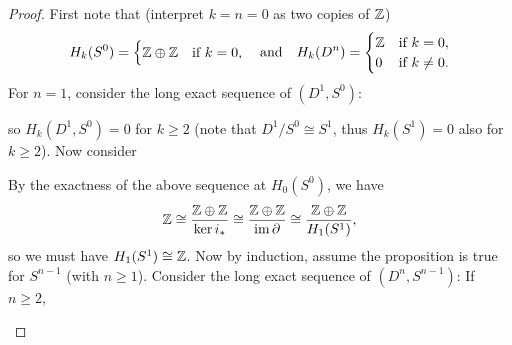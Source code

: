 \begin{proof}
  First note that (interpret $k = n = 0$ as
  two copies of $\mathbb{Z}$)
  \[
    H_k(S^0) =
    \begin{cases}
      \mathbb{Z} \oplus \mathbb{Z} & \text{if } k = 0, \\
    \end{cases}
    \quad \text{and} \quad
    H_k(D^n) =
    \begin{cases}
      \mathbb{Z} & \text{if } k = 0, \\
      0 & \text{if $k \ne 0$}.
    \end{cases}
  \]
  For $n = 1$, consider the long exact sequence of
  $(D^1, S^0)$:
  \begin{center}
  \end{center}
  so $H_k(D^1, S^0) = 0$ for $k \ge 2$ (note that
  $D^1 / S^0 \cong S^1$, thus $H_k(S^1) = 0$ also
  for $k \ge 2$). Now consider
  \begin{center}
  \end{center}
  By the exactness of the above sequence at $H_0(S^0)$,
  we have
  \[
    \mathbb{Z} \cong \frac{\mathbb{Z} \oplus \mathbb{Z}}{\ker i_*}
    \cong \frac{\mathbb{Z} \oplus \mathbb{Z}}{\operatorname{im} \partial}
    \cong \frac{\mathbb{Z} \oplus \mathbb{Z}}{H_1(S^1)},
  \]
  so we must have $H_1(S^1) \cong \mathbb{Z}$.
  Now by induction, assume the proposition is
  true for $S^{n - 1}$ (with $n \ge 1$). Consider
  the long exact sequence of $(D^n, S^{n - 1})$:
  If $n \ge 2$,
  \begin{center}

\end{center}
\end{proof}
